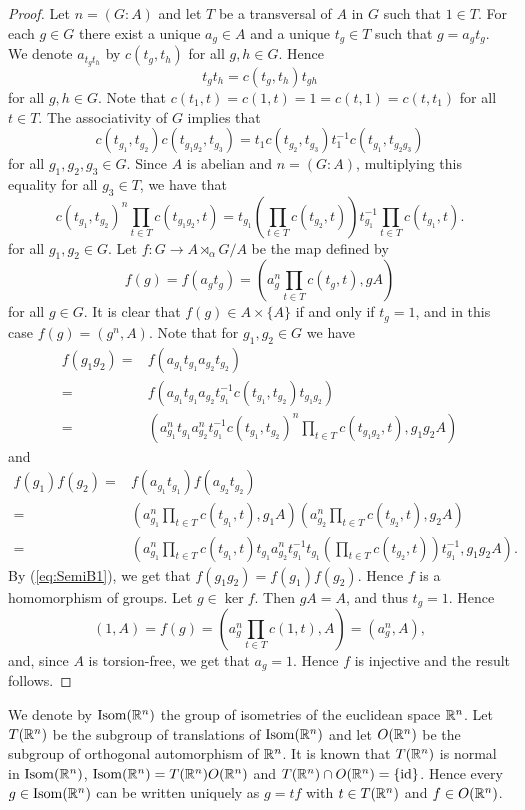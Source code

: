 \begin{proof}
Let $n=(G:A)$ and let $T$ be a transversal of $A$ in $G$ such that $1\in T$. For each $g\in G$ there exist a unique $a_g\in A$ and a unique $t_g\in T$ such that $g=a_gt_g$. We denote $a_{t_gt_h}$ by $c(t_g,t_h)$ for all $g,h\in G$. Hence
\[ t_gt_h=c(t_g,t_h)t_{gh}\]
for all $g,h\in G$. Note that $c(t_1,t)=c(1,t)=1=c(t,1)=c(t,t_1)$ for all $t\in T$. The associativity of $G$ implies that
\[c(t_{g_1},t_{g_2})c(t_{g_1g_2},t_{g_3})=t_1c(t_{g_2},t_{g_3})t_1^{-1}c(t_{g_1},t_{g_2g_3})\]
for all $g_1,g_2,g_3\in G$. Since $A$ is abelian and $n=(G:A)$, multiplying this equality for all $g_3\in T$, we have that
\begin{equation}\label{eq:SemiB1}
c(t_{g_1},t_{g_2})^n\prod_{t\in T}c(t_{g_1g_2},t)=t_{g_1}\left(\prod_{t\in T}c(t_{g_2},t)\right)t_{g_1}^{-1}\prod_{t\in T}c(t_{g_1},t).
\end{equation}
for all $g_1,g_2\in G$. Let $f\colon G\to A\rtimes_{\alpha} G/A$ be the map defined by
\[ f(g)=f(a_gt_g)=\left( a_g^n\prod_{t\in T}c(t_g,t), gA\right)\]
for all $g\in G$. It is clear that $f(g)\in A\times\{ A\}$ if and only if $t_g=1$, and in this case $f(g)=(g^n,A)$. Note that for $g_1,g_2\in G$ we have
\begin{align*}
    f(g_1g_2)=&f(a_{g_1}t_{g_1}a_{g_2}t_{g_2})\\
    =&f(a_{g_1}t_{g_1}a_{g_2}t_{g_1}^{-1}c(t_{g_1},t_{g_2})t_{g_1g_2})\\
    =&\left(a_{g_1}^nt_{g_1}a_{g_2}^nt_{g_1}^{-1}c(t_{g_1},t_{g_2})^n\prod_{t\in T}c(t_{g_1g_2},t),g_1g_2A\right)
\end{align*}
and
\begin{align*}
    f(g_1)f(g_2)=&f(a_{g_1}t_{g_1})f(a_{g_2}t_{g_2})\\
    =&\left(a_{g_1}^n\prod_{t\in T}c(t_{g_1},t),g_1A\right)\left(a_{g_2}^n\prod_{t\in T}c(t_{g_2},t),g_2A\right)\\
    =&\left(a_{g_1}^n\prod_{t\in T}c(t_{g_1},t)t_{g_1}a_{g_2}^nt_{g_1}^{-1}t_{g_1}\left(\prod_{t\in T}c(t_{g_2},t)\right)t_{g_1}^{-1},g_1g_2A\right).
\end{align*}
By (\ref{eq:SemiB1}), we get that $f(g_1g_2)=f(g_1)f(g_2)$. Hence $f$ is a homomorphism of groups. Let $g\in \ker f$. Then $gA=A$, and thus $t_g=1$. Hence
\[ (1,A)=f(g)=\left( a_g^n\prod_{t\in T}c(1,t), A\right)=(a_{g}^n,A),\]
and, since $A$ is torsion-free, we get that $a_g=1$. Hence $f$ is injective and the result follows.
\end{proof}

We denote by $\operatorname{Isom}(\mathbb{R}^n)$ the group of isometries of the euclidean space $\mathbb{R}^n$. Let $T(\mathbb{R}^n)$ be the subgroup of translations of $\operatorname{Isom}(\mathbb{R}^n)$ and let $O(\mathbb{R}^n)$ be the subgroup of orthogonal automorphism of $\mathbb{R}^n$. It is known that $T(\mathbb{R}^n)$ is normal in $\operatorname{Isom}(\mathbb{R}^n)$, $\operatorname{Isom}(\mathbb{R}^n)=T(\mathbb{R}^n)O(\mathbb{R}^n)$ and $T(\mathbb{R}^n)\cap O(\mathbb{R}^n)=\{\operatorname{id}\}$. Hence every $g\in \operatorname{Isom}(\mathbb{R}^n)$ can be written uniquely as $g=tf$ with $t\in T(\mathbb{R}^n)$ and $f\in O(\mathbb{R}^n)$.

